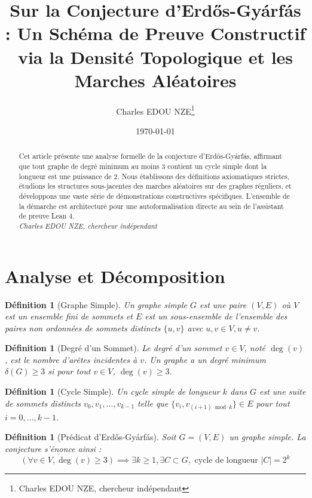 \documentclass[12pt,a4paper]{article}
\title{Sur la Conjecture d'Erd\H{o}s-Gy\'arf\'as : Un Sch\'ema de Preuve Constructif via la Densit\'e Topologique et les Marches Al\'eatoires}
\author{Charles EDOU NZE\thanks{Charles EDOU NZE, chercheur ind\'ependant}}
\date{\today}
\newtheorem{definition}[theorem]{D\'efinition}
\begin{document}
\maketitle

\begin{abstract}
Cet article pr\'esente une analyse formelle de la conjecture d'Erd\H{o}s-Gy\'arf\'as, affirmant que tout graphe de degr\'e minimum au moins 3 contient un cycle simple dont la longueur est une puissance de 2. Nous \'etablissons des d\'efinitions axiomatiques strictes, \'etudions les structures sous-jacentes des marches al\'eatoires sur des graphes r\'eguliers, et d\'eveloppons une vaste s\'erie de d\'emonstrations constructives sp\'ecifiques. L'ensemble de la d\'emarche est architectur\'e pour une autoformalisation directe au sein de l'assistant de preuve Lean 4.
\vspace{0.5cm}\\
\noindent \textit{Charles EDOU NZE, chercheur ind\'ependant}
\end{abstract}

\tableofcontents
\newpage

\section{Analyse et D\'ecomposition}

\begin{definition}[Graphe Simple]
Un graphe simple $G$ est une paire $(V, E)$ o\`u $V$ est un ensemble fini de sommets et $E$ est un sous-ensemble de l'ensemble des paires non ordonn\'ees de sommets distincts $\{u, v\}$ avec $u, v \in V, u \neq v$.
\end{definition}

\begin{definition}[Degr\'e d'un Sommet]
Le degr\'e d'un sommet $v \in V$, not\'e $\deg(v)$, est le nombre d'ar\^etes incidentes \`a $v$. Un graphe a un degr\'e minimum $\delta(G) \geq 3$ si pour tout $v \in V$, $\deg(v) \geq 3$.
\end{definition}

\begin{definition}[Cycle Simple]
Un cycle simple de longueur $k$ dans $G$ est une suite de sommets distincts $v_0, v_1, \dots, v_{k-1}$ telle que $\{v_i, v_{(i+1) \bmod k}\} \in E$ pour tout $i = 0, \dots, k-1$.
\end{definition}

\begin{definition}[Pr\'edicat d'Erd\H{o}s-Gy\'arf\'as]
Soit $G = (V, E)$ un graphe simple. La conjecture s'\'enonce ainsi :
$$ (\forall v \in V, \deg(v) \geq 3) \implies \exists k \geq 1, \exists C \subset G, \text{ cycle de longueur } |C| = 2^k $$
\end{definition}
\end{document}

